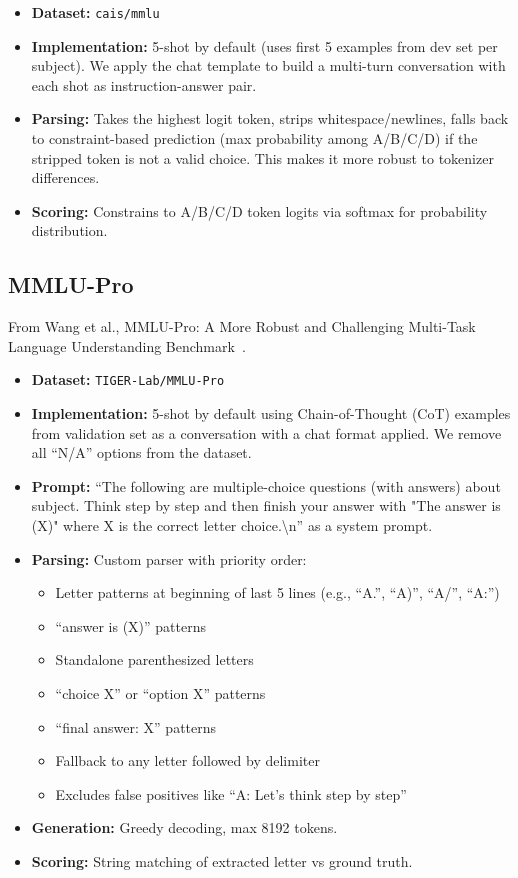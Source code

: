 \documentclass{article}
\begin{document}
\begin{itemize}
    \item \textbf{Dataset:} \texttt{cais/mmlu}
    \item \textbf{Implementation:} 5-shot by default (uses first 5 examples from dev set per subject). We apply the chat template to build a multi-turn conversation with each shot as instruction-answer pair.
    \item \textbf{Parsing:} Takes the highest logit token, strips whitespace/newlines, falls back to constraint-based prediction (max probability among A/B/C/D) if the stripped token is not a valid choice. This makes it more robust to tokenizer differences.
    \item \textbf{Scoring:} Constrains to A/B/C/D token logits via softmax for probability distribution.
\end{itemize}

\subsection*{MMLU-Pro}

From Wang et al., MMLU-Pro: A More Robust and Challenging Multi-Task Language Understanding Benchmark~\citep{wang2024mmlupro}.

\begin{itemize}
    \item \textbf{Dataset:} \texttt{TIGER-Lab/MMLU-Pro}
    \item \textbf{Implementation:} 5-shot by default using Chain-of-Thought (CoT) examples from validation set as a conversation with a chat format applied. We remove all ``N/A'' options from the dataset.
    \item \textbf{Prompt:} ``The following are multiple-choice questions (with answers) about {subject}. Think step by step and then finish your answer with "The answer is (X)" where X is the correct letter choice.\textbackslash n'' as a system prompt.
    \item \textbf{Parsing:} Custom parser with priority order:
    \begin{itemize}
        \item Letter patterns at beginning of last 5 lines (e.g., ``A.'', ``A)'', ``A/'', ``A:'')
        \item ``answer is (X)'' patterns
        \item Standalone parenthesized letters
        \item ``choice X'' or ``option X'' patterns
        \item ``final answer: X'' patterns
        \item Fallback to any letter followed by delimiter
        \item Excludes false positives like ``A: Let's think step by step''
    \end{itemize}
    \item \textbf{Generation:} Greedy decoding, max 8192 tokens.
    \item \textbf{Scoring:} String matching of extracted letter vs ground truth.
\end{itemize}
\end{document}

